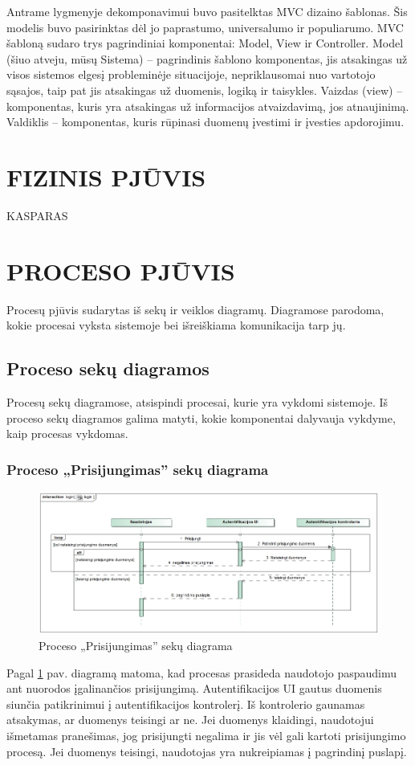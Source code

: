 \documentclass{VUMIFPSkursinis}
\begin{document}
Antrame lygmenyje dekomponavimui buvo pasitelktas MVC dizaino šablonas. Šis modelis buvo pasirinktas dėl jo paprastumo, universalumo ir populiarumo.
MVC šabloną sudaro trys pagrindiniai komponentai: Model, View ir Controller. Model (šiuo atveju, mūsų Sistema) – pagrindinis šablono komponentas, jis atsakingas už visos sistemos elgesį probleminėje situacijoje, nepriklausomai nuo vartotojo sąsajos, taip pat jis atsakingas už duomenis, logiką ir taisykles. Vaizdas (view) – komponentas, kuris
yra atsakingas už informacijos atvaizdavimą, jos atnaujinimą. Valdiklis – komponentas,
kuris rūpinasi duomenų įvestimi ir įvesties apdorojimu.

\newpage
\section{FIZINIS PJŪVIS}
KASPARAS
\newpage
\section{PROCESO PJŪVIS}
Procesų pjūvis sudarytas iš sekų ir veiklos diagramų. Diagramose parodoma, kokie procesai
vyksta sistemoje bei išreiškiama komunikacija tarp jų.
\subsection{Proceso sekų diagramos}
Procesų sekų diagramose, atsispindi procesai, kurie yra vykdomi sistemoje. Iš proceso
sekų diagramos galima matyti, kokie komponentai dalyvauja vykdyme, kaip procesas vykdomas.
\subsubsection{Proceso „Prisijungimas” sekų diagrama}
\begin{figure}[H]
	\centering
	\includegraphics[width=\linewidth]{img/login.jpg}
	\caption{Proceso „Prisijungimas” sekų diagrama}
	\label{fig:login}
\end{figure}
Pagal \ref{fig:login} pav. diagramą matoma, kad procesas prasideda naudotojo paspaudimu ant nuorodos įgalinančios prisijungimą. Autentifikacijos
UI gautus duomenis siunčia patikrinimui į autentifikacijos kontrolerį. Iš kontrolerio
gaunamas atsakymas, ar duomenys teisingi ar ne. Jei duomenys klaidingi, naudotojui išmetamas pranešimas,
jog prisijungti negalima ir jis vėl gali kartoti prisijungimo procesą. Jei duomenys teisingi,
naudotojas yra nukreipiamas į pagrindinį puslapį.
\end{document}
